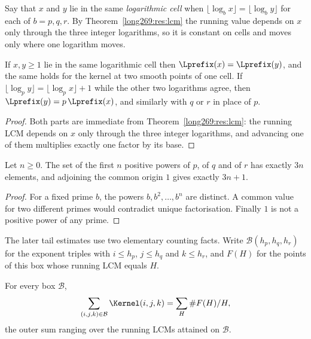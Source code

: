 Say that $x$ and $y$ lie in the same \emph{logarithmic cell} when
$\lfloor\log_b x\rfloor=\lfloor\log_b y\rfloor$ for each of $b=p,q,r$.  By Theorem~\ref{long269:res:lcm} the running value depends on $x$ only
through the three integer logarithms, so it is constant on cells and moves only
where one logarithm moves.

\begin{proposition}\label{long269:res:cell}
If $x,y\ge1$ lie in the same logarithmic cell then $\Lprefix(x)=\Lprefix(y)$,
and the same holds for the kernel at two smooth points of one cell.  If
$\lfloor\log_p y\rfloor=\lfloor\log_p x\rfloor+1$ while the other two
logarithms agree, then $\Lprefix(y)=p\,\Lprefix(x)$, and similarly with $q$ or
$r$ in place of $p$.
\end{proposition}

\begin{proof}
Both parts are immediate from Theorem~\ref{long269:res:lcm}: the running LCM depends on $x$
only through the three integer logarithms, and advancing one of them multiplies
exactly one factor by its base.
\end{proof}

\label{long269:res:jump}

\begin{proposition}\label{long269:res:count}
Let $n\ge0$.  The set of the first $n$ positive powers of $p$, of $q$ and of
$r$ has exactly $3n$ elements, and adjoining the common origin $1$ gives
exactly $3n+1$.
\end{proposition}

\begin{proof}
For a fixed prime $b$, the powers $b,b^{2},\ldots,b^{n}$ are distinct.
A common value for two different primes would contradict unique
factorisation.  Finally $1$ is not a
positive power of any prime.
\end{proof}


The later tail estimates use two elementary counting facts.  Write
$\mathcal B(h_p,h_q,h_r)$ for the exponent triples with
$i\le h_p$, $j\le h_q$ and $k\le h_r$, and $F(H)$ for the points of this
box whose running LCM equals $H$.

\begin{proposition}\label{long269:res:fibre}
For every box $\mathcal B$,
\[
 \sum_{(i,j,k)\in\mathcal B}\Kernel(i,j,k)=\sum_{H}\#F(H)/H,
\]
the outer sum ranging over the running LCMs attained on $\mathcal B$.
\end{proposition}

